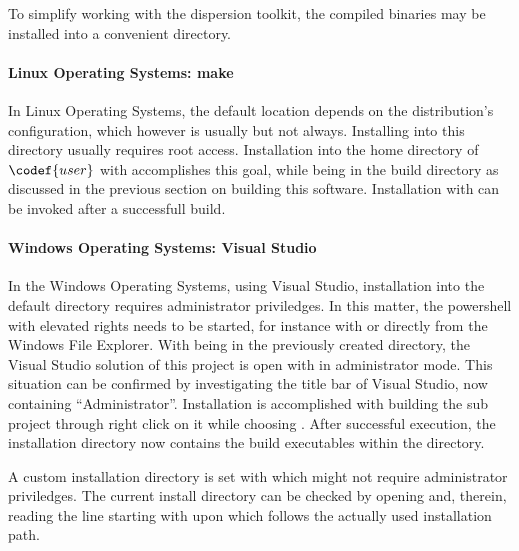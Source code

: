 
To simplify working with the dispersion toolkit, the compiled binaries may be installed into a convenient directory. 

\paragraph{Linux Operating Systems: make}

In Linux Operating Systems, the default location depends on the distribution's configuration, which however is usually
but not always. Installing into this directory usually requires root access. Installation into the home directory of $\codef{user}$ with
accomplishes this goal, while being in the build directory as discussed in the previous section on building this software. Installation with
can be invoked after a successfull build.


\paragraph{Windows Operating Systems: Visual Studio}

In the Windows Operating Systems, using Visual Studio, installation into the default directory
requires administrator priviledges. In this matter, the powershell with elevated rights needs to be started, for instance with
or directly from the Windows File Explorer. With being in the previously created
directory, the Visual Studio solution of this project is open with
in administrator mode. This situation can be confirmed by investigating the title bar of Visual Studio, now containing \enquote{Administrator}. Installation is accomplished with building the sub project
through right click on it while choosing . After successful execution, the installation directory now contains the build executables within the
directory.

A custom installation directory is set with
which might not require administrator priviledges. The current install directory can be checked by opening  and, therein, reading the line starting with
upon which follows the actually used installation path.
